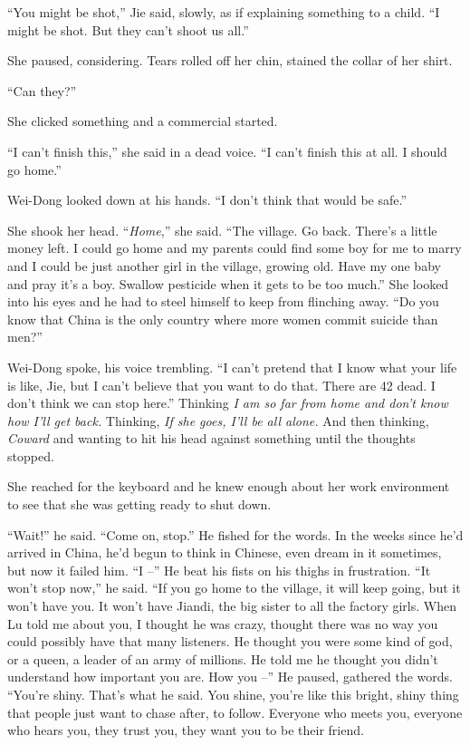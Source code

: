 ``You might be shot,'' Jie said, slowly, as if explaining something
to a child. ``I might be shot. But they can't shoot us all.''

She paused, considering. Tears rolled off her chin, stained the
collar of her shirt.

``Can they?''

She clicked something and a commercial started.

``I can't finish this,'' she said in a dead voice. ``I can't finish
this at all. I should go home.''

Wei-Dong looked down at his hands. ``I don't think that would be
safe.''

She shook her head. ``\emph{Home},'' she said. ``The village. Go back.
There's a little money left. I could go home and my parents could
find some boy for me to marry and I could be just another girl in
the village, growing old. Have my one baby and pray it's a boy.
Swallow pesticide when it gets to be too much.'' She looked into his
eyes and he had to steel himself to keep from flinching away. ``Do
you know that China is the only country where more women commit
suicide than men?''

Wei-Dong spoke, his voice trembling. ``I can't pretend that I know
what your life is like, Jie, but I can't believe that you want to
do that. There are 42 dead. I don't think we can stop here.''
Thinking
\emph{I am so far from home and don't know how I'll get back.}
Thinking, \emph{If she goes, I'll be all alone.} And then thinking,
\emph{Coward} and wanting to hit his head against something until
the thoughts stopped.

She reached for the keyboard and he knew enough about her work
environment to see that she was getting ready to shut down.

``Wait!'' he said. ``Come on, stop.'' He fished for the words. In the
weeks since he'd arrived in China, he'd begun to think in Chinese,
even dream in it sometimes, but now it failed him. ``I --'' He beat
his fists on his thighs in frustration. ``It won't stop now,'' he
said. ``If you go home to the village, it will keep going, but it
won't have you. It won't have Jiandi, the big sister to all the
factory girls. When Lu told me about you, I thought he was crazy,
thought there was no way you could possibly have that many
listeners. He thought you were some kind of god, or a queen, a
leader of an army of millions. He told me he thought you didn't
understand how important you are. How you --'' He paused, gathered
the words. ``You're shiny. That's what he said. You shine, you're
like this bright, shiny thing that people just want to chase after,
to follow. Everyone who meets you, everyone who hears you, they
trust you, they want you to be their friend.

